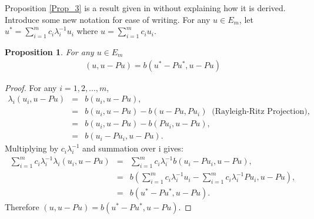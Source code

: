 \documentclass[../../main.tex]{subfiles}
\begin{document}
Proposition \ref{Prop_3} is a result given in \cite{SF73} without explaining how it is derived.\\

Introduce some new notation for ease of writing. For any $u \in E_{m}$, let $u^{*} = \sum_{i=1}^{m} c_{i}\lambda_{i}^{-1}u_{i}$ where $u = \sum_{i=1}^{m} c_{i}u_{i}$.\\

\newtheorem{Prop_4}[Prop_1]{Proposition} \label{Prop_4}
\begin{Prop_4}
	For any $u \in E_{m}$
		\begin{eqnarray*}
		( u, u - Pu ) = b(u^{*} - Pu^{*}, u -Pu)
		\end{eqnarray*}
\end{Prop_4}
\begin{proof}
	For any $i = 1,2,...,m$,
	\begin{eqnarray*}
	\lambda_{i}( u_{i},u-Pu ) &=&  b(u_{i}, u-Pu),\\
								&=& b(u_{i}, u-Pu) - b(u-Pu,Pu_{i}) \ \textrm{ (Rayleigh-Ritz Projection)},\\
								&=&  b(u_{i}, u-Pu) - b(Pu_{i},u-Pu),\\
								&=&  b(u_{i}-Pu_{i}, u-Pu).
	\end{eqnarray*}
	Multiplying by $c_{i}\lambda_{i}^{-1}$ and summation over i gives:
	\begin{eqnarray*}
	\sum_{i=1}^{m} c_{i}\lambda_{i}^{-1}\lambda_{i}( u_{i},u-Pu ) &=& \sum_{i=1}^{m} c_{i}\lambda_{i}^{-1}b(u_{i}-Pu_{i}, u-Pu),\\
								&=& b(\sum_{i=1}^{m} c_{i}\lambda_{i}^{-1}u_{i}-\sum_{i=1}^{m} c_{i}\lambda_{i}^{-1}Pu_{i}, u-Pu),\\
										&=& b(u^{*}-Pu^{*}, u-Pu).
	\end{eqnarray*}
	Therefore $( u,u-Pu ) = b(u^{*}-Pu^{*}, u-Pu)$.
\end{proof}
\end{document}
